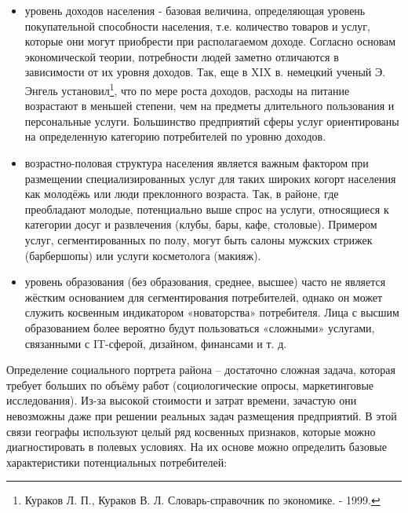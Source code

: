\documentclass[
  11pt,
]{book}
\begin{document}
\begin{itemize}
\item
  уровень доходов населения - базовая величина, определяющая уровень покупательной способности населения, т.е. количество
  товаров и услуг, которые они могут приобрести при располагаемом доходе.
  Согласно основам экономической теории, потребности людей заметно отличаются в зависимости от их уровня доходов. Так, еще в XIX в.
  немецкий ученый Э. Энгель установил\footnote{Кураков Л. П., Кураков В. Л. Словарь-справочник по экономике. - 1999.}, что по мере роста доходов, расходы на питание возрастают в меньшей степени, чем на предметы длительного пользования и персональные услуги. Большинство предприятий сферы услуг ориентированы на определенную категорию потребителей по уровню доходов.
\item
  возрастно-половая структура населения является важным фактором при размещении специализированных услуг для таких
  широких когорт населения как молодёжь или люди преклонного возраста. Так, в районе, где преобладают молодые, потенциально выше спрос на услуги, относящиеся к категории досуг и развлечения (клубы, бары, кафе, столовые). Примером услуг,
  сегментированных по полу, могут быть салоны мужских стрижек (барбершопы) или услуги косметолога (макияж).
\item
  уровень образования (без образования, среднее, высшее) часто не является жёстким основанием для сегментирования
  потребителей, однако он может служить косвенным индикатором «новаторства» потребителя. Лица с высшим образованием более вероятно будут пользоваться «сложными» услугами, связанными с IT-сферой, дизайном, финансами и т. д.
\end{itemize}

Определение социального портрета района -- достаточно сложная задача, которая требует больших по объёму работ (социологические опросы, маркетинговые исследования). Из-за высокой стоимости и затрат времени, зачастую они невозможны даже при решении реальных задач размещения предприятий. В этой связи географы используют целый ряд косвенных признаков, которые можно диагностировать в полевых условиях. На их основе можно определить базовые характеристики потенциальных потребителей:
\end{document}
